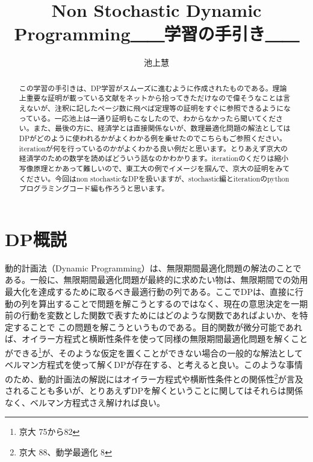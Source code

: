 \documentclass{jsarticle}
\begin{document}
\title{Non Stochastic Dynamic Programming＿＿学習の手引き＿＿}
\author{池上慧}
\maketitle

\begin{abstract}
この学習の手引きは、DP学習がスムーズに進むように作成されたものである。理論上重要な証明が載っている文献をネットから拾ってきただけなので偉そうなことは言えないが、注釈に記したページ数に飛べば定理等の証明をすぐに参照できるようになっている。一応池上は一通り証明もこなしたので、わからなかったら聞いてください。また、最後の方に、経済学とは直接関係ないが、数理最適化問題の解法としてはDPがどのように使われるかがよくわかる例を乗せたのでこちらもご参照ください。iterationが何を行っているのかがよくわかる良い例だと思います。とりあえず京大の経済学のための数学を読めばどういう話なのかわかります。iterationのくだりは縮小写像原理とかあって難しいので、東工大の例でイメージを掴んで、京大の証明をみてください。今回はnon stochasticなDPを扱いますが、stochastic編とiterationのpythonプログラミングコード編も作ろうと思います。
\end{abstract}

\section{DP概説}
動的計画法（Dynamic Programming）は、無限期間最適化問題の解法のことである。一般に、無限期間最適化問題が最終的に求めたい物は、無限期間での効用最大化を達成するために取るべき最適行動の列である。ここでDPは、直接に行動の列を算出することで問題を解こうとするのではなく、現在の意思決定を一期前の行動を変数とした関数で表すためにはどのような関数であればよいか、を特定することで
この問題を解こうというものである。目的関数が微分可能であれば、オイラー方程式と横断性条件を使って同様の無限期間最適化問題を解くことができる\footnote{京大 75から82}が、そのような仮定を置くことができない場合の一般的な解法としてベルマン方程式を使って解くDPが存在する、と考えると良い。このような事情のため、動的計画法の解説にはオイラー方程式や横断性条件との関係性\footnote{京大 88、動学最適化 8}が言及されることも多いが、とりあえずDPを解くということに関してはそれらは関係なく、ベルマン方程式さえ解ければ良い。
\end{document}
